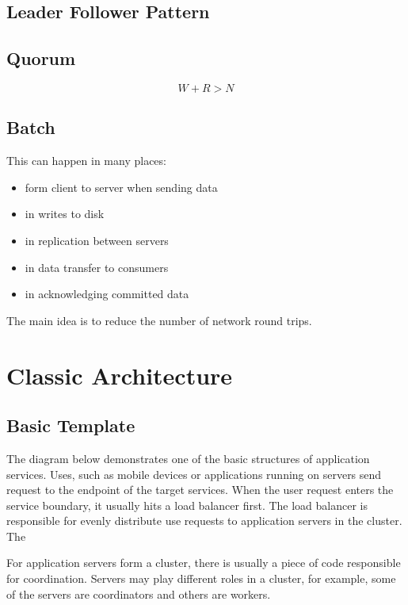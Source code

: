 \documentclass[letterpaper, oneside]{book}
\theoremstyle{definition}
\theoremstyle{remark}
\begin{document}
\section{Leader Follower Pattern}

\section{Quorum}

\begin{displaymath}
    W + R > N
\end{displaymath}

\section{Batch}

This can happen in many places:
\begin{itemize}
    \item form client to server when sending data
    \item in writes to disk
    \item in replication between servers
    \item in data transfer to consumers
    \item in acknowledging committed data
\end{itemize}

The main idea is to reduce the number of network round trips.



\chapter{Classic Architecture}

\section{Basic Template}

The diagram below demonstrates one of the basic structures of application services. Uses, such as mobile devices or applications running on servers send request to the endpoint of the target services. When the user request enters the service boundary, it usually hits a load balancer first. The load balancer is responsible for evenly distribute use requests to application servers in the cluster. The

For application servers form a cluster, there is usually a piece of code responsible for coordination. Servers may play different roles in a cluster, for example, some of the servers are coordinators and others are workers.
\end{document}
